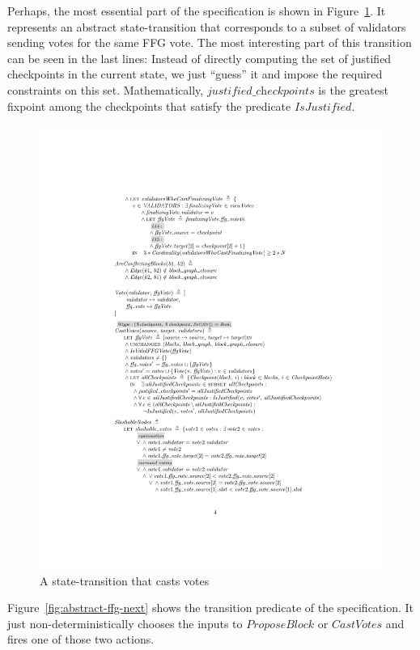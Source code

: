 Perhaps, the most essential part of the specification is shown in
Figure~\ref{fig:abstract-ffg-cast-votes}. It represents an abstract
state-transition that corresponds to a subset of validators sending votes for
the same FFG vote. The most interesting part of this transition can be seen in
the last lines: Instead of directly computing the set of justified checkpoints
in the current state, we just ``guess'' it and impose the required constraints
on this set. Mathematically, $\textit{justified\_checkpoints}$ is the greatest
fixpoint among the checkpoints that satisfy the predicate
$\textit{IsJustified}$.


\begin{figure}
    \centering
    \includegraphics[width=\textwidth]{images/abstract-ffg-cast-votes.pdf}  %
    \caption{A state-transition that casts votes}\label{fig:abstract-ffg-cast-votes}
\end{figure}

Figure~\ref{fig:abstract-ffg-next} shows the transition predicate of the
specification. It just non-deterministically chooses the inputs to
$\textit{ProposeBlock}$ or $\textit{CastVotes}$ and fires one of those two
actions.

